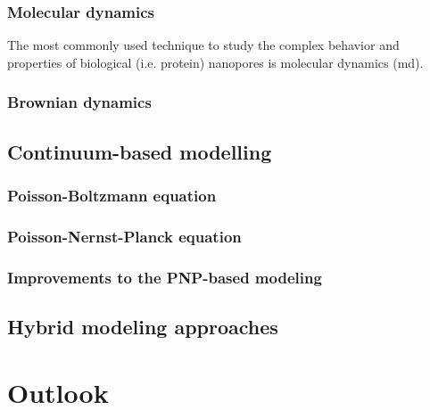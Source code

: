 \subsubsection{Molecular dynamics}
The most commonly used technique to study the complex behavior and properties of biological (i.e. protein) nanopores is molecular dynamics (\gls{md}).

\subsubsection{Brownian dynamics}




\subsection{Continuum-based modelling}

\subsubsection{Poisson-Boltzmann equation}

\subsubsection{Poisson-Nernst-Planck equation}

\subsubsection{Improvements to the PNP-based modeling}

\subsection{Hybrid modeling approaches}

\section{Outlook}


